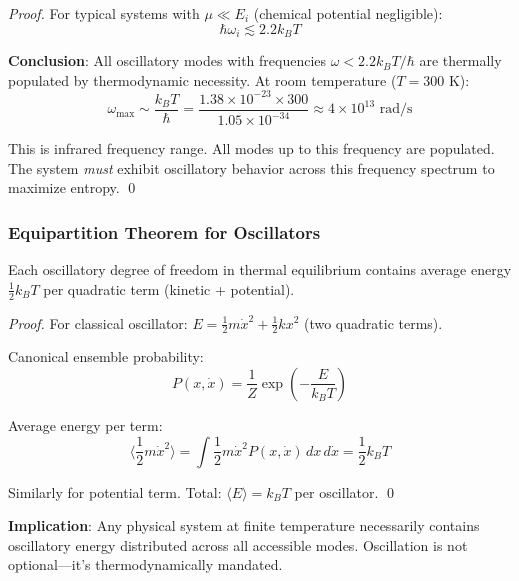 \documentclass[11pt,onecolumn]{article}
\begin{document}
\begin{proof}
For typical systems with $\mu \ll E_i$ (chemical potential negligible):
\begin{equation}
\hbar \omega_i \lesssim 2.2 k_B T
\end{equation}

\textbf{Conclusion}: All oscillatory modes with frequencies $\omega < 2.2 k_B T / \hbar$ are thermally populated by thermodynamic necessity. At room temperature ($T = 300$ K):
\begin{equation}
\omega_{\max} \sim \frac{k_B T}{\hbar} = \frac{1.38 \times 10^{-23} \times 300}{1.05 \times 10^{-34}} \approx 4 \times 10^{13} \text{ rad/s}
\end{equation}

This is infrared frequency range. All modes up to this frequency are populated. The system \textit{must} exhibit oscillatory behavior across this frequency spectrum to maximize entropy. \qed
\end{proof}

\subsubsection{Equipartition Theorem for Oscillators}

\begin{corollary}
Each oscillatory degree of freedom in thermal equilibrium contains average energy $\frac{1}{2}k_B T$ per quadratic term (kinetic + potential).
\end{corollary}

\begin{proof}
For classical oscillator: $E = \frac{1}{2}m\dot{x}^2 + \frac{1}{2}k x^2$ (two quadratic terms).

Canonical ensemble probability:
\begin{equation}
P(x, \dot{x}) = \frac{1}{Z} \exp\left(-\frac{E}{k_B T}\right)
\end{equation}

Average energy per term:
\begin{equation}
\langle \frac{1}{2}m\dot{x}^2 \rangle = \int \frac{1}{2}m\dot{x}^2 P(x,\dot{x}) \, dx \, d\dot{x} = \frac{1}{2}k_B T
\end{equation}

Similarly for potential term. Total: $\langle E \rangle = k_B T$ per oscillator. \qed
\end{proof}

\textbf{Implication}: Any physical system at finite temperature necessarily contains oscillatory energy distributed across all accessible modes. Oscillation is not optional---it's thermodynamically mandated.
\end{document}
